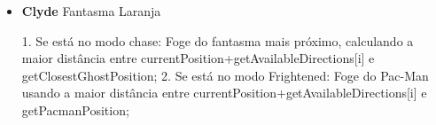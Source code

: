 \documentclass{article}
\begin{document}
\begin{itemize}
    \item \textbf{Clyde} {Fantasma Laranja}

    1. Se está no modo chase: Foge do fantasma mais próximo, calculando a maior
distância entre currentPosition+getAvailableDirections[i] e
getClosestGhostPosition;
    2. Se está no modo Frightened: Foge do Pac-Man usando a maior distância entre
currentPosition+getAvailableDirections[i] e getPacmanPosition;
\end{itemize}

\begin{comment}
[Exemplo do Paiva]
Sistema de produções do Blinky:
    1.    PACN ^ !PN ^ !DS -> AN
    2.    PACN ^ !PE ^ !DO -> AE
    3.    PACN ^ !PO ^ !DE-> AO
    4.    PACS ^ !PS ^!DN -> AS
    5.    PACS ^ !PE ^ !DO -> AE
    6.    PACS ^!PO ^!DE -> AO
    7.    PACE ^! PE ^ !DO -> AE
    8.    PACE ^ !PN ^!DS -> AN
    9.    PACE ^ !PS ^ !DN -> AS
    10.  PACO ^ !PO ^ !DE -> AO
    11.  PACO ^ !PN ^!DS -> AN
    12.  PACO ^ !PS  ^ !DN -> AS
\end{comment}
\end{document}
